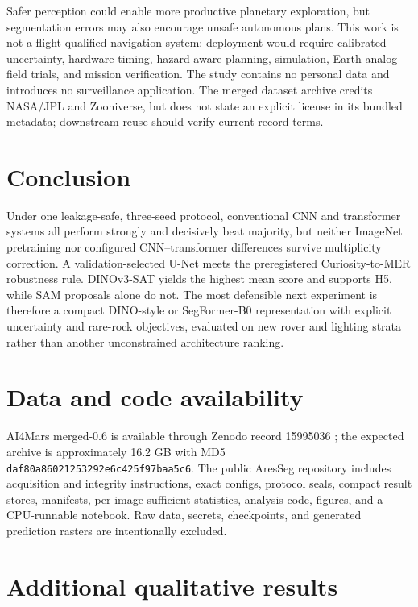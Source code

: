 \documentclass{article}
\newcommand{\code}[1]{\texttt{#1}}
\begin{document}
Safer perception could enable more productive planetary exploration, but segmentation errors may
also encourage unsafe autonomous plans. This work is not a flight-qualified navigation system:
deployment would require calibrated uncertainty, hardware timing, hazard-aware planning,
simulation, Earth-analog field trials, and mission verification. The study contains no personal
data and introduces no surveillance application. The merged dataset archive credits NASA/JPL and
Zooniverse, but does not state an explicit license in its bundled metadata; downstream reuse should
verify current record terms.

\section{Conclusion}

Under one leakage-safe, three-seed protocol, conventional CNN and transformer systems all perform
strongly and decisively beat majority, but neither ImageNet pretraining nor configured
CNN--transformer differences survive multiplicity correction. A validation-selected U-Net meets
the preregistered Curiosity-to-MER robustness rule. DINOv3-SAT yields the highest mean score and
supports H5, while SAM proposals alone do not. The most defensible next experiment is therefore a
compact DINO-style or SegFormer-B0 representation with explicit uncertainty and rare-rock
objectives, evaluated on new rover and lighting strata rather than another unconstrained
architecture ranking.

\section*{Data and code availability}

AI4Mars merged-0.6 is available through Zenodo record 15995036
\cite{ai4marszenodo}; the expected archive is approximately 16.2 GB with MD5
\code{daf80a86021253292e6c425f97baa5c6}. The public AresSeg repository includes acquisition and
integrity instructions, exact configs, protocol seals, compact result stores, manifests,
per-image sufficient statistics, analysis code, figures, and a CPU-runnable notebook. Raw data,
secrets, checkpoints, and generated prediction rasters are intentionally excluded.




\appendix

\section{Additional qualitative results}
\end{document}
